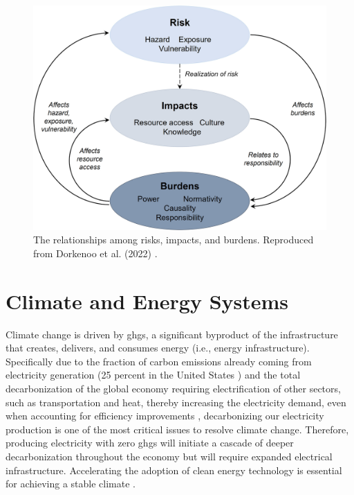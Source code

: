 \begin{figure}
    \centering
    \includegraphics[width=\columnwidth]{figures/dorkenoo-disproportionality.jpg}
    \caption{The relationships among risks, impacts, and burdens. Reproduced
    from Dorkenoo et al. (2022) \cite{dorkenoo_critical_2022}.}
    \label{fig:risk-impact-burden}
\end{figure}



\section{Climate and Energy Systems}

Climate change is driven by \acp{ghg}, a significant byproduct of the
infrastructure that creates, delivers, and consumes energy (i.e., energy
infrastructure). Specifically due to the fraction of carbon emissions already
coming from electricity generation (25 percent in the United States
\cite{us_epa_sources_2020}) and the total decarbonization of the global economy
requiring electrification of other sectors, such as transportation and heat,
thereby increasing the electricity demand, even when accounting for
efficiency improvements
\cite{national_academies_of_sciences_engineering_and_medicine_accelerating_2021,
mai_electrification_2018}, decarbonizing our electricity production is one of
the most critical issues to resolve climate change. Therefore, producing
electricity with zero \acp{ghg} will initiate a cascade of deeper
decarbonization throughout the economy but will require expanded electrical
infrastructure. Accelerating the adoption of clean energy technology is
essential for achieving a stable climate \cite{roelfsema_taking_2020,
taylor_managing_2021}.

